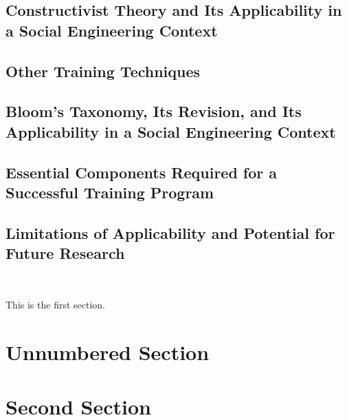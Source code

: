 \documentclass{article}
\begin{document}
\subsection{Constructivist Theory and Its Applicability in a Social Engineering Context}
\subsection{Other Training Techniques}
\subsection{Bloom's Taxonomy, Its Revision, and Its Applicability in a Social Engineering Context}
\subsection{Essential Components Required for a Successful Training Program}
\subsection{Limitations of Applicability and Potential for Future Research}

\

This is the first section.

\blindtext

\section*{Unnumbered Section}

\blindtext

\section{Second Section}

\blindtext
\end{document}

